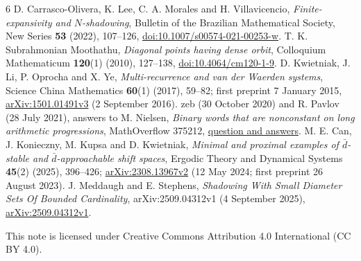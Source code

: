 \documentclass[11pt]{article}
\begin{document}
\begin{thebibliography}{6}
 D. Carrasco-Olivera, K. Lee, C. A. Morales and
H. Villavicencio, \emph{Finite-expansivity and $N$-shadowing},
Bulletin of the Brazilian Mathematical Society, New Series
\textbf{53} (2022), 107--126,
\href{https://doi.org/10.1007/s00574-021-00253-w}{doi:10.1007/s00574-021-00253-w}.
 T. K. Subrahmonian Moothathu,
\emph{Diagonal points having dense orbit},
Colloquium Mathematicum \textbf{120}(1) (2010), 127--138,
\href{https://doi.org/10.4064/cm120-1-9}{doi:10.4064/cm120-1-9}.
 D. Kwietniak, J. Li, P. Oprocha and X. Ye,
\emph{Multi-recurrence and van der Waerden systems},
Science China Mathematics \textbf{60}(1) (2017), 59--82;
first preprint 7 January 2015,
\href{https://arxiv.org/abs/1501.01491v3}{arXiv:1501.01491v3}
(2 September 2016).
 zeb (30 October 2020) and R. Pavlov (28 July 2021),
answers to M. Nielsen, \emph{Binary words that are nonconstant on
long arithmetic progressions}, MathOverflow 375212,
\href{https://mathoverflow.net/questions/375212/binary-words-that-are-nonconstant-on-long-arithmetic-progressions}{question and answers}.
 M. E. Can, J. Konieczny, M. Kupsa and D. Kwietniak,
\emph{Minimal and proximal examples of $\bar d$-stable and
$\bar d$-approachable shift spaces},
Ergodic Theory and Dynamical Systems \textbf{45}(2) (2025), 396--426;
\href{https://arxiv.org/abs/2308.13967v2}{arXiv:2308.13967v2}
(12 May 2024; first preprint 26 August 2023).
 J. Meddaugh and E. Stephens,
\emph{Shadowing With Small Diameter Sets Of Bounded Cardinality},
arXiv:2509.04312v1 (4 September 2025),
\href{https://arxiv.org/abs/2509.04312v1}{arXiv:2509.04312v1}.
\end{thebibliography}
\noindent\small
This note is licensed under Creative Commons Attribution 4.0
International (CC BY 4.0).
\end{document}
